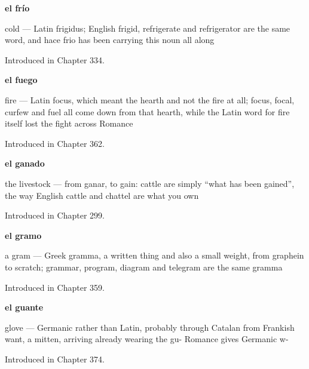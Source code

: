 \noindent\begin{minipage}[t]{\linewidth}
\raggedright
\textbf{el frío}\par
\small cold — Latin frigidus; English frigid, refrigerate and refrigerator are the same word, and hace frio has been carrying this noun all along\par
\footnotesize Introduced in Chapter 334.
\end{minipage}\par\medskip

\noindent\begin{minipage}[t]{\linewidth}
\raggedright
\textbf{el fuego}\par
\small fire — Latin focus, which meant the hearth and not the fire at all; focus, focal, curfew and fuel all come down from that hearth, while the Latin word for fire itself lost the fight across Romance\par
\footnotesize Introduced in Chapter 362.
\end{minipage}\par\medskip

\noindent\begin{minipage}[t]{\linewidth}
\raggedright
\textbf{el ganado}\par
\small the livestock — from ganar, to gain: cattle are simply \textquotedblleft{}what has been gained\textquotedblright{}, the way English cattle and chattel are what you own\par
\footnotesize Introduced in Chapter 299.
\end{minipage}\par\medskip

\noindent\begin{minipage}[t]{\linewidth}
\raggedright
\textbf{el gramo}\par
\small a gram — Greek gramma, a written thing and also a small weight, from graphein to scratch; grammar, program, diagram and telegram are the same gramma\par
\footnotesize Introduced in Chapter 359.
\end{minipage}\par\medskip

\noindent\begin{minipage}[t]{\linewidth}
\raggedright
\textbf{el guante}\par
\small glove — Germanic rather than Latin, probably through Catalan from Frankish want, a mitten, arriving already wearing the gu- Romance gives Germanic w-\par
\footnotesize Introduced in Chapter 374.
\end{minipage}\par\medskip

